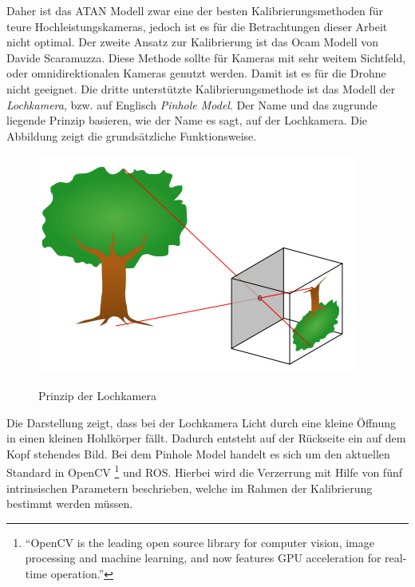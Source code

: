 Daher ist das ATAN Modell zwar eine der besten Kalibrierungsmethoden für teure Hochleistungskameras, jedoch ist es für die Betrachtungen dieser Arbeit nicht optimal. \newline
Der zweite Ansatz zur Kalibrierung ist das Ocam Modell von Davide Scaramuzza. Diese Methode sollte für Kameras mit sehr weitem Sichtfeld, oder omnidirektionalen Kameras genutzt werden. Damit ist es für die Drohne nicht geeignet. \newline
Die dritte unterstützte Kalibrierungsmethode ist das Modell der \textit{Lochkamera}, bzw. auf Englisch \textit{Pinhole Model}.
Der Name und das zugrunde liegende Prinzip basieren, wie der Name es sagt, auf der Lochkamera. Die Abbildung zeigt die grundsätzliche Funktionsweise. \newline
\begin{figure}[ht]
	\centering
	\includegraphics[scale=0.5]{Bilder/pinhole.png}
	\label{fig:pinhole}
	\caption{Prinzip der Lochkamera \cite{lochkamera}}
\end{figure}

Die Darstellung zeigt, dass bei der Lochkamera Licht durch eine kleine Öffnung in einen kleinen Hohlkörper fällt. Dadurch entsteht auf der Rückseite ein auf dem Kopf stehendes Bild. \newline
Bei dem Pinhole Model handelt es sich um den aktuellen Standard in OpenCV \footnote{``OpenCV is the leading open source library for computer vision, image processing and machine learning, and now features GPU acceleration for real-time operation.''\cite{opencv}} %
und ROS. Hierbei wird die Verzerrung mit Hilfe von fünf intrinsischen Parametern beschrieben, welche im Rahmen der Kalibrierung bestimmt werden müssen.

